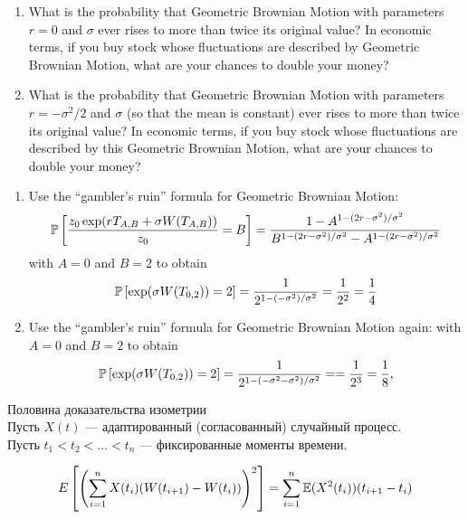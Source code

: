 \begin{problem}
  \begin{enumerate}
    \item What is the probability that Geometric Brownian
    Motion with parameters $r = 0$ and $\sigma$ ever rises to more than
    twice its original value? In economic terms, if you buy
    stock whose fluctuations are described by Geometric
    Brownian Motion, what are your chances to double your
    money?

    \item What is the probability that Geometric Brownian
    Motion with parameters $r = -\sigma^2/2$ and $\sigma$ (so
    that the mean is constant) ever rises to more than twice
    its original value?  In economic terms, if you buy stock
    whose fluctuations are described by this Geometric Brownian
    Motion, what are your chances to double your money?
  \end{enumerate}

\begin{sol}

\begin{enumerate}
  \item Use the ``gambler's ruin'' formula for Geometric
  Brownian Motion:
  $$
     \P\left[
          \frac{ z_0 \exp( r T_{A,B}
                       + \sigma W(T_{A,B}))}{z_0} = B
          \right] =
          \frac{1 - A^{1 - (2r-\sigma^2)/\sigma^2}}
               {B^{1 - (2r-\sigma^2)/\sigma^2}
               - A^{1 - (2r-\sigma^2)/\sigma^2}}
  $$
  with $A = 0$ and $B = 2$ to obtain
  $$
     \P\left[
          \exp(\sigma W(T_{0,2})) = 2
          \right] =
          \frac{1}
               {2^{1 - (-\sigma^2)/\sigma^2}} =
              \frac{1}{2^2} = \frac{1}{4}
  $$

  \item Use the ``gambler's ruin'' formula for Geometric
  Brownian Motion again:
  with $A = 0$ and $B = 2$ to obtain
  $$
     \P\left[
          \exp(\sigma W(T_{0,2})) = 2
          \right] =
          \frac{1}
               {2^{1 - (-\sigma^2-\sigma^2)/\sigma^2}} =
            = \frac{1}{2^3} = \frac{1}{8},
  $$

\end{enumerate}
\end{sol}
\end{problem}

\begin{problem}
 Половина доказательства изометрии \\
Пусть $X(t)$ — адаптированный (согласованный) случайный процесс. \\
Пусть $t_{1}<t_{2}<\ldots<t_{n}$ — фиксированные моменты времени. \\


\begin{sol}
$$E\left[\left(\sum_{i=1}^{n}X(t_{i})(W(t_{i+1})-W(t_{i}))\right)^{2}\right]=\sum_{i=1}^{n}\E(X^{2}(t_{i}))(t_{i+1}-t_{i})$$
\end{sol}
\end{problem}


